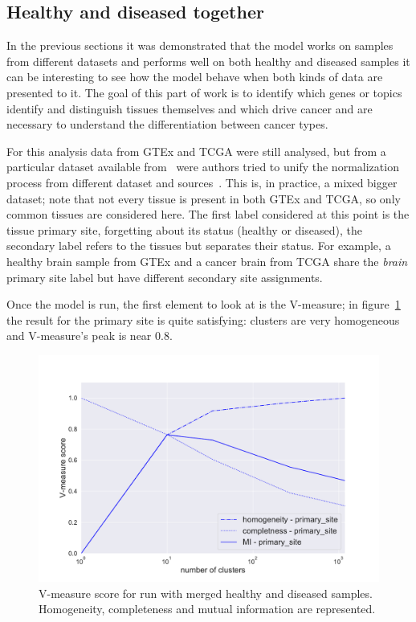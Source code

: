 \subsection{Healthy and diseased together}
In the previous sections it was demonstrated that the model works on samples from different datasets and performs well on both healthy and diseased samples it can be interesting to see how the model behave when both kinds of data are presented to it.
The goal of this part of work is to identify which genes or topics identify and distinguish tissues themselves and which drive cancer and are necessary to understand the differentiation between cancer types.

For this analysis data  from GTEx and TCGA were still analysed, but from a particular dataset available from~\cite{Wang2017} were authors tried to unify the normalization process from different dataset and sources~\cite{Betel2018}. This is, in practice, a mixed bigger dataset; note that not every tissue is present in both GTEx and TCGA, so only common tissues are considered here. The first label considered at this point is the tissue primary site, forgetting about its status (healthy or diseased), the secondary label refers to the tissues but separates their status. For example, a healthy brain sample from GTEx and a cancer brain from TCGA share the \textit{brain} primary site label but have different secondary site assignments.

Once the model is run, the first element to look at is the V-measure; in figure~\ref{fig:topic/merged/metric_scores_primarysite} the result for the primary site is quite satisfying: clusters are very homogeneous and V-measure's peak is near $0.8$.
\begin{figure}[htb!]
    \centering
    \includegraphics[width=0.8\linewidth]{pictures/topic/merged/metric_scores_primarysite.pdf}
    \caption{V-measure score for run with merged healthy and diseased samples. Homogeneity, completeness and mutual information are represented.}
    \label{fig:topic/merged/metric_scores_primarysite}
\end{figure}


